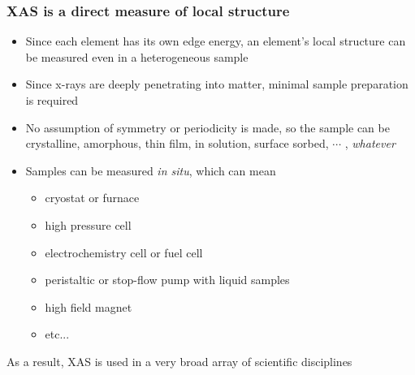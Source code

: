 \documentclass[10pt, xcolor=x11names, compress, handout]{beamer}
\begin{document}
\begin{frame}
  \frametitle{XAS is a direct measure of local structure}

  \begin{itemize}
  \item Since each element has its own edge energy, an element's
    local structure can be measured even in a heterogeneous sample
  \item Since x-rays are deeply penetrating into matter, minimal
    sample preparation is required
  \item No assumption of symmetry or periodicity is made, so the
    sample can be crystalline, amorphous, thin film, in solution,
    surface sorbed, $\cdots$ , \textit{whatever}
  \item Samples can be measured \textit{in situ}, which can mean
    \begin{itemize}
    \item cryostat or furnace
    \item high pressure cell
    \item electrochemistry cell or fuel cell
    \item peristaltic or stop-flow pump with liquid samples
    \item high field magnet
    \item etc...
    \end{itemize}
  \end{itemize}

  \begin{exampleblock}{}
    \begin{center}
      As a result, XAS is used in a very broad array of scientific
      disciplines
    \end{center}
  \end{exampleblock}


\end{frame}
\end{document}
